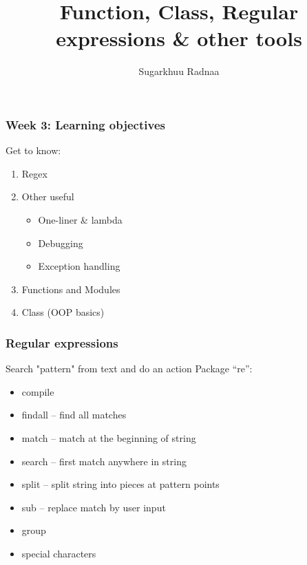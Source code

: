 \documentclass{beamer}
\title[Introduction to Python]{Function, Class, Regular expressions \& other tools}
\author{Sugarkhuu Radnaa}
\institute[]
{
Py4Econ in Ulaanbaatar \\ 
\medskip
\textit{py4econ@gmail.com} 
}
\date{}  %
\begin{document}
\begin{frame}
\titlepage %
\end{frame}

\begin{frame}
    \frametitle{Week 3: Learning objectives}
    Get to know: 
    \begin{enumerate}
        \item Regex 
        \item Other useful
        \begin{itemize}
            \item One-liner & lambda
            \item Debugging
            \item Exception handling
        \end{itemize}
        \item Functions and Modules
        \item Class (OOP basics)         
    \end{enumerate}
\end{frame}


\begin{frame}
    \frametitle{Regular expressions}
Search "pattern"  from text and do an action
Package “re”:
    \begin{itemize}
        \item compile
        \item findall – find all matches
        \item match – match at the beginning of string
        \item search – first match anywhere in string
        \item split – split string into pieces at pattern points
        \item sub – replace match by user input
        \item group 
        \item special characters
    \end{itemize}
\end{frame}
\end{document}
